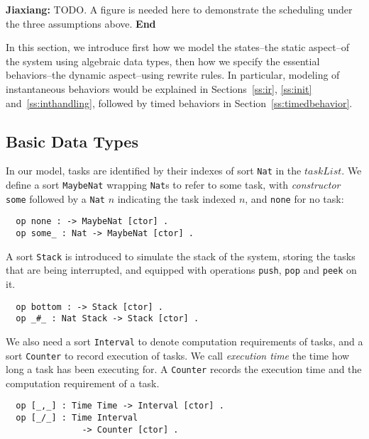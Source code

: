 \documentclass[10pt,journal,compsoc]{IEEEtran}
\newcommand{\hide}[1]{\ignorespaces}
\newcommand{\jx}[1]{{\bf Jiaxiang: }#1{ \bf End}}
\begin{document}
\jx{TODO. A figure is needed here to demonstrate the scheduling under
  the three assumptions above.}

In this section, we introduce first how we model the states--the
static aspect--of the system using algebraic data types, then how we
specify the essential behaviors--the dynamic aspect--using rewrite
rules. In particular, modeling of instantaneous behaviors would be
explained in Sections~\ref{ss:ir}, \ref{ss:init}
and~\ref{ss:inthandling}, followed by timed behaviors in
Section~\ref{ss:timedbehavior}.

\subsection{Basic Data Types}
In our model, tasks are identified by their indexes of sort \verb|Nat|
in the $taskList$. We define a sort \verb|MaybeNat| wrapping
\verb|Nat|s to refer to some task, with \emph{constructor} \verb|some|
followed by a \verb|Nat| $n$ indicating the task indexed $n$, and
\verb|none| for no task:
\begin{verbatim}
  op none : -> MaybeNat [ctor] .
  op some_ : Nat -> MaybeNat [ctor] .
\end{verbatim}

A sort \verb|Stack| is introduced to simulate the stack of the system,
storing the tasks that are being interrupted, and equipped with
operations \verb|push|, \verb|pop| and \verb|peek| on it.
\begin{verbatim}
  op bottom : -> Stack [ctor] .
  op _#_ : Nat Stack -> Stack [ctor] .
\end{verbatim}

We also need a sort \verb|Interval| to denote computation requirements
of tasks, and a sort \verb|Counter| to record execution of tasks.  We
call \emph{execution time} the time how long a task has been executing
for. A \verb|Counter| records the execution time and the computation
requirement of a task.
\begin{verbatim}
  op [_,_] : Time Time -> Interval [ctor] .  
  op [_/_] : Time Interval 
               -> Counter [ctor] .
\end{verbatim}

\hide{
At last, to make our model checkable by untimed model checking, it is
reasonable to reset the global variable $timer$ when it reaches an
upperbound while increasing (see Line~\ref{l:timer} in
Figure~\ref{a:schedule}) in the model. Then $timer$ is of sort
\verb|Timer| and the upperbound would be the least common multiple of
the periods of all tasks.}
\end{document}

